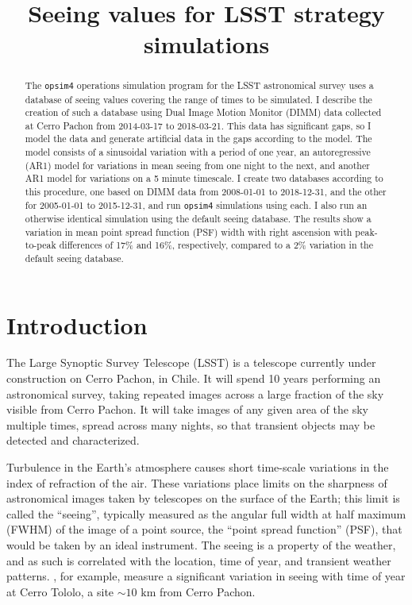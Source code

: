 \documentclass[\docopts]{\docclass}
\begin{document}

\title{Seeing values for LSST strategy simulations}

\maketitlepre

\begin{abstract}

The \texttt{opsim4} operations simulation program for the LSST astronomical
survey uses a database of seeing values covering the range of times to
be simulated. I describe the creation of such a database using Dual
Image Motion Monitor (DIMM) data collected at Cerro Pachon from
2014-03-17 to 2018-03-21. This data has significant gaps, so I model
the data and generate artificial data in the gaps according to the
model. The model consists of a sinusoidal variation with a period of
one year, an autoregressive (AR1) model for variations in mean seeing
from one night to the next, and another AR1 model for variations on a
5 minute timescale. I create two databases according to this
procedure, one based on DIMM data from 2008-01-01 to 2018-12-31, and
the other for 2005-01-01 to 2015-12-31, and run \texttt{opsim4} simulations
using each. I also run an otherwise identical simulation using the
default seeing database. The results show a variation in mean point
spread function (PSF) width with right ascension with peak-to-peak
differences of 17\% and 16\%, respectively, compared to a 2\%
variation in the default seeing database.
 
\end{abstract}

\dockeys{}

\maketitlepost


\section{Introduction}
\label{sec:intro}

The Large Synoptic Survey Telescope (LSST) is a telescope currently
under construction on Cerro Pachon, in Chile. It will spend 10 years
performing an astronomical survey, taking repeated images across a
large fraction of the sky visible from Cerro Pachon. It will take
images of any given area of the sky multiple times, spread across many
nights, so that transient objects may be detected and characterized.

Turbulence in the Earth's atmosphere causes short time-scale variations
in the index of refraction of the air. These variations place limits
on the sharpness of astronomical images taken by telescopes on the
surface of the Earth; this limit is called the ``seeing'', typically
measured as the angular full width at half maximum (FWHM) of the image
of a point source, the ``point spread function'' (PSF), that would be
taken by an ideal instrument. The seeing is a property of the weather,
and as such is correlated with the location, time of year, and
transient weather patterns. \textcite{2009PASP..121..922E}, for example,
measure a significant variation in seeing with time of year at Cerro
Tololo, a site $\sim10 \mbox{ km}$ from Cerro Pachon.
\end{document}
